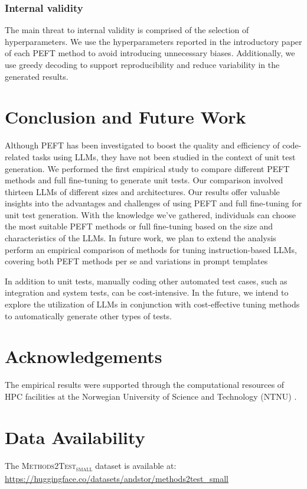\documentclass[12pt]{book}
\begin{document}
\subsubsection{Internal validity}
The main threat to internal validity is comprised of the selection of hyperparameters. We use the hyperparameters reported in the introductory paper of each PEFT method to avoid introducing unnecessary biases. Additionally, we use greedy decoding to support reproducibility and reduce variability in the generated results.

\section{Conclusion and Future Work}
\label{chap:conclusion}
Although PEFT has been investigated to boost the quality and efficiency of code-related tasks using LLMs, they have not been studied in the context of unit test generation. We performed the first empirical study to compare different PEFT methods and full fine-tuning to generate unit tests. Our comparison involved thirteen LLMs of different sizes and architectures. Our results offer valuable insights into the advantages and challenges of using PEFT and full fine-tuning for unit test generation. With the knowledge we've gathered, individuals can choose the most suitable PEFT methods or full fine-tuning based on the size and characteristics of the LLMs. In future work, we plan to extend the analysis perform an empirical comparison of methods for tuning instruction-based LLMs, covering both PEFT methods per se and variations in prompt templates

In addition to unit tests, manually coding other automated test cases, such as integration and system tests, can be cost-intensive. In the future, we intend to explore the utilization of LLMs in conjunction with cost-effective tuning methods to automatically generate other types of tests.

\section*{Acknowledgements}
The empirical results were supported through the computational resources of HPC facilities at the Norwegian University of Science and Technology (NTNU) \citep{sjalander2019epic}.

\section*{Data Availability}
\noindent The \textsc{Methods2Test\textsubscript{small}} dataset is available at:\\
\url{https://huggingface.co/datasets/andstor/methods2test_small}\\
\end{document}
